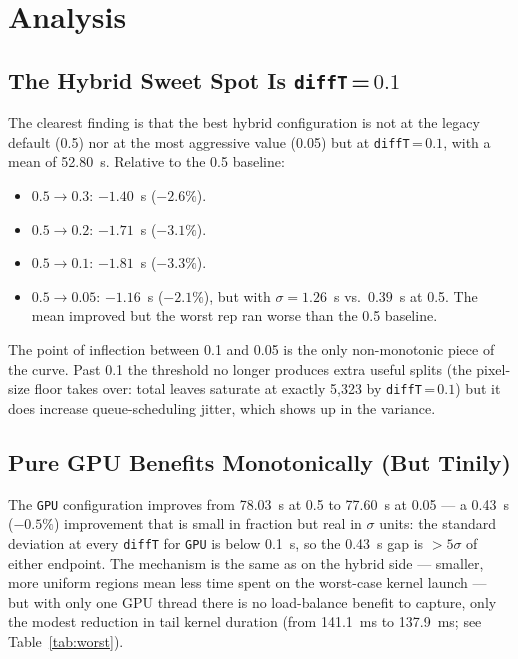 \documentclass[
	english,
	letterpaper, oneside
]{article}
\begin{document}
\section{Analysis}

\subsection{The Hybrid Sweet Spot Is \texttt{diffT}\,=\,$0.1$}

The clearest finding is that the best hybrid configuration is not at
the legacy default (0.5) nor at the most aggressive value (0.05) but at
\texttt{diffT}\,=\,$0.1$, with a mean of 52.80~s. Relative to the 0.5
baseline:

\begin{itemize}
    \item $0.5 \to 0.3$: $-1.40$~s ($-2.6\%$).
    \item $0.5 \to 0.2$: $-1.71$~s ($-3.1\%$).
    \item $0.5 \to 0.1$: $-1.81$~s ($-3.3\%$).
    \item $0.5 \to 0.05$: $-1.16$~s ($-2.1\%$), but with $\sigma=1.26$~s
    vs.\ $0.39$~s at 0.5. The mean improved but the worst rep ran
    worse than the 0.5 baseline.
\end{itemize}

\noindent
The point of inflection between 0.1 and 0.05 is the only non-monotonic
piece of the curve. Past 0.1 the threshold no longer produces extra
useful splits (the pixel-size floor takes over: total leaves saturate
at exactly 5{,}323 by \texttt{diffT}\,=\,$0.1$) but it does increase
queue-scheduling jitter, which shows up in the variance.

\subsection{Pure GPU Benefits Monotonically (But Tinily)}

The \texttt{GPU} configuration improves from 78.03~s at 0.5 to 77.60~s
at 0.05 --- a 0.43~s ($-0.5\%$) improvement that is small in fraction
but real in $\sigma$ units: the standard deviation at every
\texttt{diffT} for \texttt{GPU} is below 0.1~s, so the 0.43~s gap is
$>5\sigma$ of either endpoint. The mechanism is the same as on the
hybrid side --- smaller, more uniform regions mean less time spent on
the worst-case kernel launch --- but with only one GPU thread there is
no load-balance benefit to capture, only the modest reduction in tail
kernel duration (from 141.1~ms to 137.9~ms; see
Table~\ref{tab:worst}).
\end{document}

